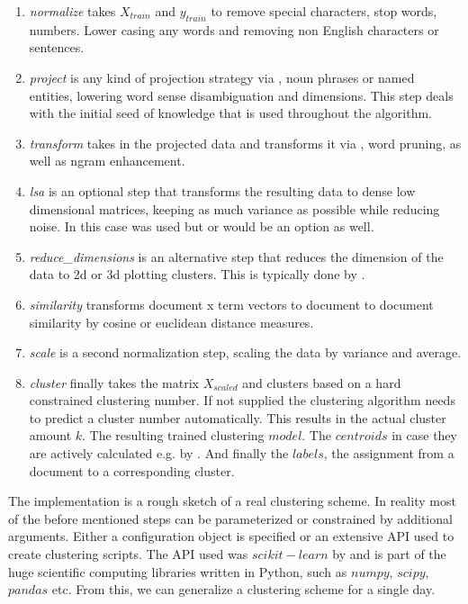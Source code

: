   \begin{enumerate}
    \item \emph{normalize} takes $X_{train}$ and $y_{train}$ to remove special characters, stop words, numbers. Lower casing any words and removing non English characters or sentences. 
    \item \emph{project} is any kind of projection strategy via \wordnet{}, noun phrases or named entities, lowering word sense disambiguation and dimensions. This step deals with the initial seed of knowledge that is used throughout the algorithm.
    \item \emph{transform} takes in the projected data and transforms it via \tfidf{}, word pruning, as well as ngram enhancement.
    \item \emph{lsa} is an optional step that transforms the resulting data to dense low dimensional matrices, keeping as much variance as possible while reducing noise. In this case \lsa{} was used but \lda{} or \hdp{} would be an option as well. 
    \item \emph{reduce\_dimensions} is an alternative step that reduces the dimension of the data to 2d or 3d plotting clusters. This is typically done by \pca{}.
    \item \emph{similarity} transforms document x term vectors to document to document similarity by cosine or euclidean distance measures.
    \item \emph{scale} is a second normalization step, scaling the data by variance and average.
    \item \emph{cluster} finally takes the matrix $X_{scaled}$ and clusters based on a hard constrained clustering number. If not supplied the clustering algorithm needs to predict a cluster number automatically. This results in the actual cluster amount $k$. The resulting trained clustering $model$. The $centroids$ in case they are actively calculated e.g. by \kmeans{}. And finally the $labels$, the assignment from a document to a corresponding cluster.
  \end{enumerate}

The implementation is a rough sketch of a real clustering scheme. In reality most of the before mentioned steps can be parameterized or constrained by additional arguments. Either a configuration object is specified or an extensive API used to create clustering scripts. The API used was $scikit-learn$ by \cite{ScikitLearn} and is part of the huge scientific computing libraries written in Python, such as $numpy$, $scipy$, $pandas$ etc. From this, we can generalize a clustering scheme for a single day.

